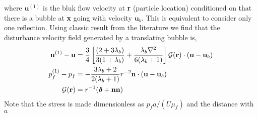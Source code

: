 \documentclass[12pt]{My_preprint}
\begin{document}
where $\textbf{u}^{(1)}$ is the bluk flow velocity at \textbf{r} (particle location) conditioned on that there is a bubble at \textbf{x} going with velocity $\textbf{u}_b$. 
This is equivalent to consider only one reflection. 
Using classic result from the literature we find that the disturbance velocity field generated by a translating bubble is, 
\begin{align*}
    \textbf{u}^{(1)} - \textbf{u}
    &=
    \frac{3}{4}\left[
        \frac{(2+3\lambda_b)}{3(1+\lambda_b)}
        + 
        \frac{\lambda_b\mathbf{\nabla}^2}{6(\lambda_b+1)}
        \right]\mathcal{G}(\textbf{r})\cdot
    (\textbf{u}- \textbf{u}_b)\\
    p_f^{(1)} - p_f
    &=
    -\frac{3\lambda_b+2}{2(\lambda_b+1)}r^{-2} \textbf{n}\cdot (\textbf{u}- \textbf{u}_b)\\
    \mathcal{G}(\textbf{r})
    &=
    r^{-1}(\bm\delta + \textbf{nn})
\end{align*}
Note that the stress is made dimensionless as $p_f  a / (U \mu_f)$ and the distance with $a$
\end{document}
